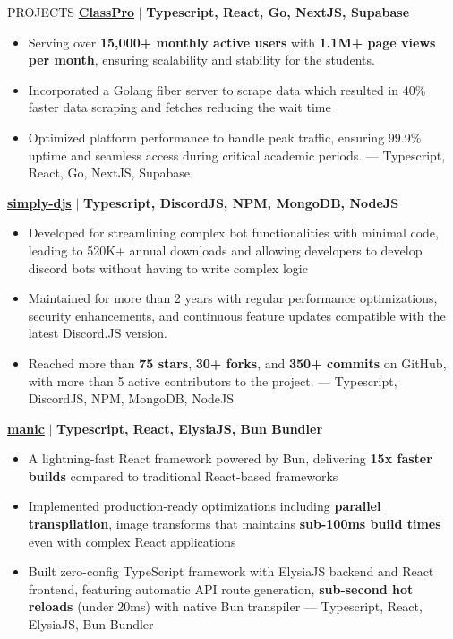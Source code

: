 \documentclass{resume} %
\begin{document}
\begin{rSection}{PROJECTS}    
    \textbf{\href{https://github.com/Rahuletto/ClassPro}{ClassPro}} \(\mid\) \textbf{Typescript, React, Go, NextJS, Supabase}
\begin{itemize}
\itemsep -3pt{}
\item Serving over \textbf{15,000+ monthly active users} with \textbf{1.1M+ page views per month}, ensuring scalability and stability for the students.
\item Incorporated a Golang fiber server to scrape data which resulted in 40\% faster data scraping and fetches reducing the wait time
\item Optimized platform performance to handle peak traffic, ensuring 99.9\% uptime and seamless access during critical academic periods.
---
Typescript, React, Go, NextJS, Supabase
\end{itemize}
\textbf{\href{https://github.com/Rahuletto/simply-djs}{simply-djs}} \(\mid\) \textbf{Typescript, DiscordJS, NPM, MongoDB, NodeJS}
\begin{itemize}
\itemsep -3pt{}
\item Developed for streamlining complex bot functionalities with minimal code, leading to 520K+ annual downloads and allowing developers to develop discord bots without having to write complex logic
\item Maintained for more than 2 years with regular performance optimizations, security enhancements, and continuous feature updates compatible with the latest Discord.JS version.
\item Reached more than \textbf{75 stars}, \textbf{30+ forks}, and \textbf{350+ commits} on GitHub, with more than 5 active contributors to the project.
---
Typescript, DiscordJS, NPM, MongoDB, NodeJS
\end{itemize}
\textbf{\href{https://github.com/Rahuletto/manic}{manic}} \(\mid\) \textbf{Typescript, React, ElysiaJS, Bun Bundler}
\begin{itemize}
\itemsep -3pt{}
\item A lightning-fast React framework powered by Bun, delivering \textbf{15x faster builds} compared to traditional React-based frameworks
\item Implemented production-ready optimizations including \textbf{parallel transpilation}, image transforms that maintains \textbf{sub-100ms build times} even with complex React applications
\item Built zero-config TypeScript framework with ElysiaJS backend and React frontend, featuring automatic API route generation, \textbf{sub-second hot reloads} (under 20ms) with native Bun transpiler
---
Typescript, React, ElysiaJS, Bun Bundler
\end{itemize}
\end{rSection}
\end{document}
